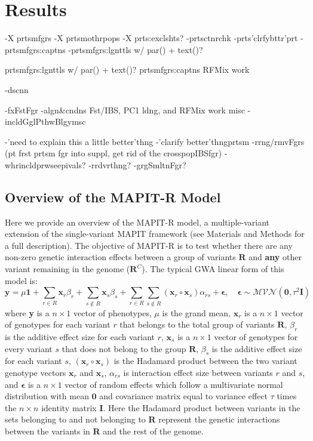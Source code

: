 \documentclass[12pt,a4paper]{article}
\begin{document}
\section{Results}\label{InterPath-Results}

-X prtsmfgrs
-X prtsmothrpops
-X prts:exclshts?
-prtsctnrchk
-prts'clrfybttr'prt
-prtsmfgrs:captns
-prtsmfgrs:lgnttls w/ par() + text()?

prtsmfgrs:lgnttls w/ par() + text()?
prtsmfgrs:captns
RFMix work


-dscnn

-fxFstFgr
-algn\&cndns Fst/IBS, PC1 ldng, and RFMix work misc
-incldGglPthwBlgymsc




-'need to explain this a little better'thng
-'clarify better'thngprtsm
-rrng/rmvFgrs (pt frst prtsm fgr into suppl, get rid of the crosspopIBSfgr)
-whrincldprwseepivals?
-rrdvrthng?
-grgSmltnFgr?

\subsection{Overview of the MAPIT-R Model}\label{InterPath-Results-MAPITRModel}

Here we provide an overview of the MAPIT-R model, a multiple-variant extension of the single-variant MAPIT framework (see Materials and Methods for a full description). The objective of MAPIT-R is to test whether there are any non-zero genetic interaction effects between a group of variants $\textbf{R}$ and \textbf{any} other variant remaining in the genome ($\textbf{R}^C$). The typical GWA linear form of this model is:  
\begin{equation}\label{Overview1}
\textbf{y} = \mu\textbf{1} + \sum_{r \in R} \textbf{x}_r\beta_r + \sum_{s \not\in R} \textbf{x}_s\beta_s + \sum_{r \in R}\sum_{s \not\in R} (\textbf{x}_r \circ \textbf{x}_s)\alpha_{rs} + \boldsymbol{\epsilon}, \quad \boldsymbol{\epsilon} \sim \mathcal{MVN}(\textbf{0}, \tau^{2}\textbf{I})  
\end{equation}
where \textbf{y} is a $n \times 1$ vector of phenotypes, $\mu$ is the grand mean, $\textbf{x}_r$ is a $n \times 1$ vector of genotypes for each variant $r$ that belongs to the total group of variants $\textbf{R}$, $\beta_r$ is the additive effect size for each variant $r$, $\textbf{x}_s$ is a $n \times 1$ vector of genotypes for every variant $s$ that does not belong to the group $\textbf{R}$, $\beta_s$ is the additive effect size for each variant $s$, $(\textbf{x}_r \circ \textbf{x}_s)$ is the Hadamard product between the two variant genotype vectors $\textbf{x}_r$ and $\textbf{x}_s$, $\alpha_{rs}$ is interaction effect size between variants $r$ and $s$, and $\boldsymbol{\epsilon}$ is a $n \times 1$ vector of random effects which follow a multivariate normal distribution with mean $\textbf{0}$ and covariance matrix equal to variance effect $\tau$ times the $n \times n$ identity matrix $\textbf{I}$. Here the Hadamard product between variants in the sets belonging to and not belonging to \textbf{R} represent the genetic interactions between the variants in \textbf{R} and the rest of the genome.
\end{document}
